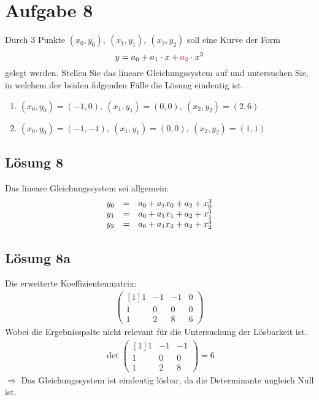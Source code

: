 \documentclass[main.tex]{subfiles}
\begin{document}
\section{Aufgabe 8}
Durch $3$ Punkte $( x_{0} ,y_{0}) ,\ ( x_{1} ,y_{1}) ,\ ( x_{2} ,y_{2})$ soll eine Kurve der Form
\begin{equation*}
    y=a_{0} +a_{1} \cdotp x+\textcolor[rgb]{0.82,0.01,0.11}{a_{2}} \cdotp x^{3}
\end{equation*}
gelegt werden. Stellen Sie das lineare Gleichungssystem auf und untersuchen Sie, in welchem der beiden folgenden Fälle die Lösung eindeutig ist.

\begin{enumerate}
    \item $( x_{0} ,y_{0}) =( -1,0) ,\ ( x_{1} ,y_{1}) =( 0,0) ,\ ( x_{2} ,y_{2}) =( 2,6)$
    \item $( x_{0} ,y_{0}) =( -1,-1) ,\ ( x_{1} ,y_{1}) =( 0,0) ,\ ( x_{2} ,y_{2}) =( 1,1)$
\end{enumerate}

\subsection{Lösung 8}
Das lineare Gleichungssystem sei allgemein:
\begin{equation*}
    \begin{array}{ r c l }
    y_{0} & = & a_{0} +a_{1} x_{0} +a_{2} +x_{0}^{3}\\
    y_{1} & = & a_{0} +a_{1} x_{1} +a_{2} +x_{1}^{3}\\
    y_{2} & = & a_{0} +a_{1} x_{2} +a_{2} +x_{2}^{3}
    \end{array}
\end{equation*}

\subsection{Lösung 8a}
Die erweiterte Koeffizientenmatrix:
\begin{gather*}
    \begin{pmatrix}[1]
    1 & -1 & -1 & 0\\
    1 & 0 & 0 & 0\\
    1 & 2 & 8 & 6
    \end{pmatrix}
\end{gather*}
Wobei die Ergebnisspalte nicht relevant für die Untersuchung der Lösbarkeit ist.
\begin{gather*}
    \det\begin{pmatrix}[1]
    1 & -1 & -1\\
    1 & 0 & 0\\
    1 & 2 & 8
    \end{pmatrix} =6
\end{gather*}
$\Rightarrow$ Das Gleichungssystem ist eindeutig lösbar, da die Determinante ungleich Null ist.
\end{document}

